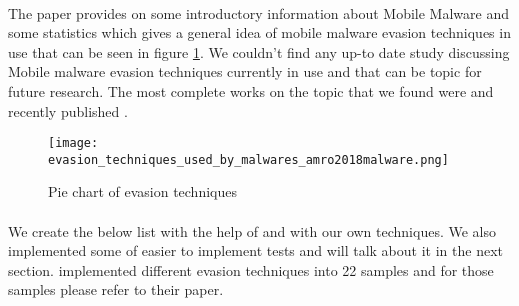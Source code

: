 \documentclass[../main.tex]{subfile}
\begin{document}
	\paragraph{} The paper \cite{amro2018malware} provides on some introductory information about Mobile Malware and some statistics which gives a general idea of mobile malware evasion techniques in use that can be seen in figure \ref{fig:pie_evasion}. We couldn't find any up-to date study discussing Mobile malware evasion techniques currently in use and that can be topic for future research.  The most complete works on the topic that we found were \cite{vidas2014evading} and recently published \cite{ares}.
	
	\begin{figure}
		\texttt{[image: evasion\_techniques\_used\_by\_malwares\_amro2018malware.png]}
		\caption{Pie chart of evasion techniques \cite{amro2018malware}}
		\label{fig:pie_evasion}			
	\end{figure}
	
	
	\paragraph{} We create the below list with the help of \cite{vidas2014evading} \cite{sophos_anti_emulation} and with our own techniques. We also implemented some of easier to implement tests and will talk about it in the next section. \cite{ares} implemented different evasion techniques into 22 samples and for those samples please refer to their paper.
		
\end{document}
